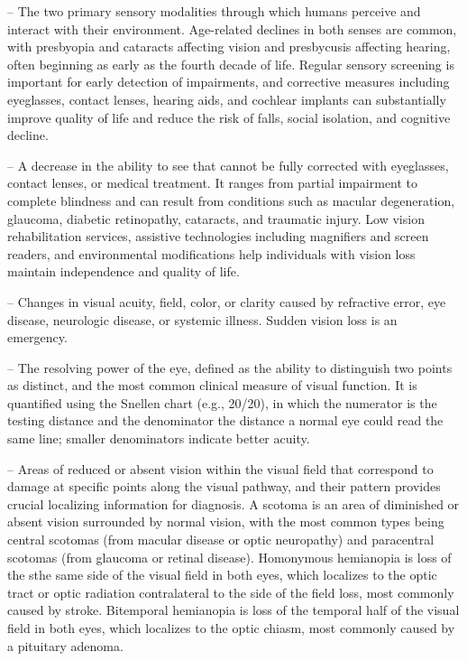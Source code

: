 -- The two primary sensory modalities through which humans perceive and interact with their environment. Age-related declines in both senses are common, with presbyopia and cataracts affecting vision and presbycusis affecting hearing, often beginning as early as the fourth decade of life. Regular sensory screening is important for early detection of impairments, and corrective measures including eyeglasses, contact lenses, hearing aids, and cochlear implants can substantially improve quality of life and reduce the risk of falls, social isolation, and cognitive decline.

-- A decrease in the ability to see that cannot be fully corrected with eyeglasses, contact lenses, or medical treatment. It ranges from partial impairment to complete blindness and can result from conditions such as macular degeneration, glaucoma, diabetic retinopathy, cataracts, and traumatic injury. Low vision rehabilitation services, assistive technologies including magnifiers and screen readers, and environmental modifications help individuals with vision loss maintain independence and quality of life.

-- Changes in visual acuity, field, color, or clarity caused by refractive error, eye disease, neurologic disease, or systemic illness. Sudden vision loss is an emergency.

-- The resolving power of the eye, defined as the ability to distinguish two points as distinct, and the most common clinical measure of visual function. It is quantified using the Snellen chart (e.g., 20/20), in which the numerator is the testing distance and the denominator the distance a normal eye could read the same line; smaller denominators indicate better acuity.

-- Areas of reduced or absent vision within the visual field that correspond to damage at specific points along the visual pathway, and their pattern provides crucial localizing information for diagnosis. A scotoma is an area of diminished or absent vision surrounded by normal vision, with the most common types being central scotomas (from macular disease or optic neuropathy) and paracentral scotomas (from glaucoma or retinal disease). Homonymous hemianopia is loss of the sthe same side of the visual field in both eyes, which localizes to the optic tract or optic radiation contralateral to the side of the field loss, most commonly caused by stroke. Bitemporal hemianopia is loss of the temporal half of the visual field in both eyes, which localizes to the optic chiasm, most commonly caused by a pituitary adenoma.

